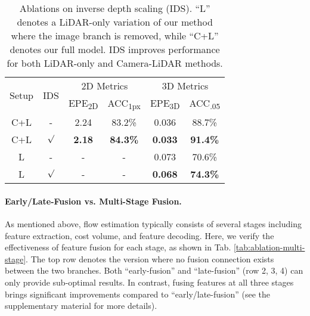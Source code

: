 \documentclass[10pt,twocolumn,letterpaper]{article}
\begin{document}
\begin{table}[t]
    \centering
    \begin{tabular}{c|c|cc|cc}
    \hline
    \multirow{2}{*}{Setup} & \multirow{2}{*}{IDS} & \multicolumn{2}{c|}{2D Metrics} & \multicolumn{2}{c}{3D Metrics} \\
    & & EPE\textsubscript{2D} & ACC\textsubscript{1px} & EPE\textsubscript{3D} & ACC\textsubscript{.05} \\
    \hline
    C+L & -       & 2.24 & 83.2\% & 0.036 & 88.7\% \\
    C+L & $\surd$ & \textbf{2.18} & \textbf{84.3\%} & \textbf{0.033} & \textbf{91.4\%} \\
    \hline
    L & -         & - & - & 0.073 & 70.6\% \\
    L & $\surd$   & - & - & \textbf{0.068} & \textbf{74.3\%} \\
    \hline
    \end{tabular}
    \vspace{-5pt}
    \caption{Ablations on inverse depth scaling (IDS). ``L'' denotes a LiDAR-only variation of our method where the image branch is removed, while ``C+L'' denotes our full model. IDS improves performance for both LiDAR-only and Camera-LiDAR methods.}
    \vspace{-5pt}
    \label{tab:ablation-ids}
\end{table}

\vspace{-10pt}
\paragraph{Early/Late-Fusion vs. Multi-Stage Fusion.} As mentioned above, flow estimation typically consists of several stages including feature extraction, cost volume, and feature decoding. Here, we verify the effectiveness of feature fusion for each stage, as shown in Tab. \ref{tab:ablation-multi-stage}. The top row denotes the version where no fusion connection exists between the two branches. Both ``early-fusion'' and ``late-fusion'' (row 2, 3, 4) can only provide sub-optimal results. In contrast, fusing features at all three stages brings significant improvements compared to ``early/late-fusion'' (see the supplementary material for more details).
\end{document}
